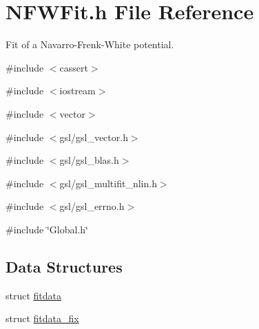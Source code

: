 \section{NFWFit.h File Reference}
\label{NFWFit_8h}


Fit of a Navarro-\/Frenk-\/White potential.  


{\ttfamily \#include $<$cassert$>$}\par
{\ttfamily \#include $<$iostream$>$}\par
{\ttfamily \#include $<$vector$>$}\par
{\ttfamily \#include $<$gsl/gsl\_\-vector.h$>$}\par
{\ttfamily \#include $<$gsl/gsl\_\-blas.h$>$}\par
{\ttfamily \#include $<$gsl/gsl\_\-multifit\_\-nlin.h$>$}\par
{\ttfamily \#include $<$gsl/gsl\_\-errno.h$>$}\par
{\ttfamily \#include \char`\"{}Global.h\char`\"{}}\par
\subsection*{Data Structures}
\begin{DoxyCompactItemize}
\item 
struct \hyperlink{structfitdata}{fitdata}
\item 
struct \hyperlink{structfitdata__fix}{fitdata\_\-fix}
\end{DoxyCompactItemize}

